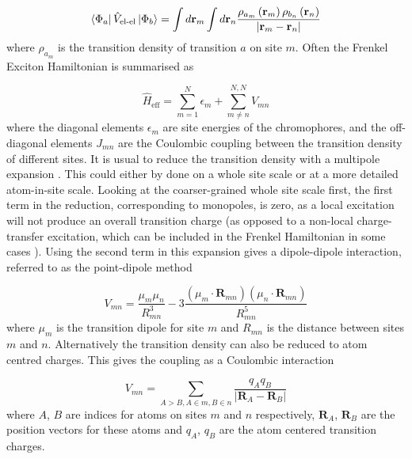 \begin{equation}
\label{eq:coupling_density}
\bra{\Phi_a} \hat{V}_{\text{el-el}}\ket{\Phi_b} = \int d\mathbf{r}_{m} \int d\mathbf{r}_{n} \frac{\rho_{a_m}\left(\mathbf{r}_{m}\right)\rho_{b_n}\left(\mathbf{r}_{n}\right)}{\left|\mathbf{r}_{m} - \mathbf{r}_{n}\right|}
\end{equation}
%
where $\rho_{a_m}$ is the transition density of transition $a$ on site $m$. Often
the Frenkel Exciton Hamiltonian is summarised as

\begin{equation}
\hat{H}_{\text{eff}} = \sum^N_{m=1} \epsilon_m + \sum^{N,N}_{m \neq n} V_{mn}
\end{equation}
%
where the diagonal elements $\epsilon_m$ are site energies of the chromophores, 
and the off-diagonal elements $J_{mn}$ are the Coulombic coupling between the transition
density of different sites. It is usual to reduce the transition density with a 
multipole expansion \cite{Steinmann2015}. This could either by done on a whole site
scale or at a more detailed atom-in-site scale. Looking at the coarser-grained whole
site scale first, the first term in the reduction, corresponding to monopoles, is
zero, as a local excitation will not produce an overall transition charge (as opposed 
to a non-local charge-transfer excitation, which can be included in the Frenkel 
Hamiltonian in some cases \cite{Li2017}). Using the second term in this expansion 
gives a dipole-dipole interaction, referred to as the point-dipole method

\begin{equation}
    V_{mn} = \frac{\mu_m \mu_n}{R_{mn}^3} - 3 \frac{\left(\mu_m \cdot \mathbf{R}_{mn}\right) \left( \mu_n \cdot \mathbf{R}_{mn} \right)}{R_{mn}^5}
\end{equation}
%
where $\mu_m$ is the transition dipole for site $m$ and $R_{mn}$ is the distance
between sites $m$ and $n$. Alternatively the transition density can also be reduced 
to atom centred charges. This gives the coupling as a Coulombic interaction

\begin{equation}
    V_{mn} = \sum_{A>B,A \in m, B \in n}\frac{q_A q_B}{\left\lvert \mathbf{R}_A - \mathbf{R}_B \right\rvert}
\end{equation}
%
where $A$, $B$ are indices for atoms on sites $m$ and $n$ respectively, $\mathbf{R}_A$, $\mathbf{R}_B$
are the position vectors for these atoms and $q_A$, $q_B$ are the atom centered 
transition charges.

